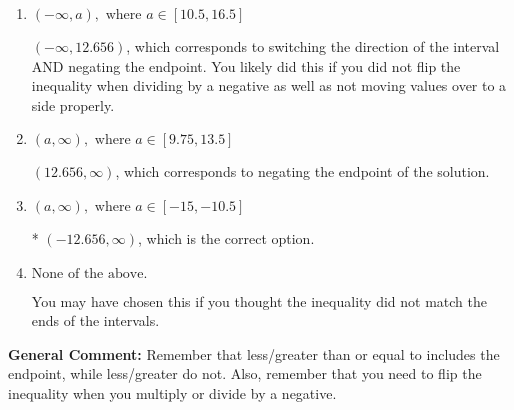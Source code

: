 \documentclass{extbook}[14pt]
\begin{document}
\begin{enumerate}
{\begin{enumerate}[label=\Alph*.]
 $(-\infty, -12.656)$, which corresponds to switching the direction of the interval. You likely did this if you did not flip the inequality when dividing by a negative!
\item \( (-\infty, a), \text{ where } a \in [10.5, 16.5] \)

 $(-\infty, 12.656)$, which corresponds to switching the direction of the interval AND negating the endpoint. You likely did this if you did not flip the inequality when dividing by a negative as well as not moving values over to a side properly.
\item \( (a, \infty), \text{ where } a \in [9.75, 13.5] \)

 $(12.656, \infty)$, which corresponds to negating the endpoint of the solution.
\item \( (a, \infty), \text{ where } a \in [-15, -10.5] \)

* $(-12.656, \infty)$, which is the correct option.
\item \( \text{None of the above}. \)

You may have chosen this if you thought the inequality did not match the ends of the intervals.
\end{enumerate}

\textbf{General Comment:} Remember that less/greater than or equal to includes the endpoint, while less/greater do not. Also, remember that you need to flip the inequality when you multiply or divide by a negative.
}
\end{enumerate}
\end{document}
